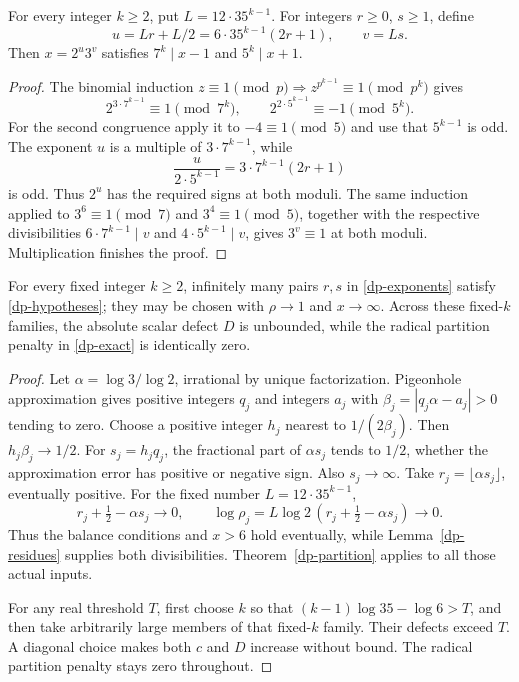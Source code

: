 \begin{lemma}\label{dp-residues}
For every integer \(k\ge2\), put \(L=12\cdot35^{k-1}\).
For integers \(r\ge0\), \(s\ge1\), define
\begin{equation}\label{dp-exponents}
 u=Lr+L/2=6\cdot35^{k-1}(2r+1),\qquad v=Ls.
\end{equation}
Then \(x=2^u3^v\) satisfies \(7^k\mid x-1\) and \(5^k\mid x+1\).
\end{lemma}
\begin{proof}
The binomial induction
\(z\equiv1\pmod p\Rightarrow z^{p^{k-1}}\equiv1\pmod{p^k}\)
gives
\[
 2^{3\cdot7^{k-1}}\equiv1\pmod{7^k},\qquad
 2^{2\cdot5^{k-1}}\equiv-1\pmod{5^k}.
\]
For the second congruence apply it to \(-4\equiv1\pmod5\) and use
that \(5^{k-1}\) is odd. The exponent \(u\) is a multiple of
\(3\cdot7^{k-1}\), while
\[
 \frac{u}{2\cdot5^{k-1}}=3\cdot7^{k-1}(2r+1)
\]
is odd. Thus \(2^u\) has the required signs at both moduli.
The same induction applied to \(3^6\equiv1\pmod7\) and
\(3^4\equiv1\pmod5\), together with the respective divisibilities
\(6\cdot7^{k-1}\mid v\) and \(4\cdot5^{k-1}\mid v\), gives
\(3^v\equiv1\) at both moduli. Multiplication finishes the proof.
\end{proof}

\begin{theorem}
\label{dp-infinite}
For every fixed integer \(k\ge2\), infinitely many pairs \(r,s\) in
\eqref{dp-exponents} satisfy \eqref{dp-hypotheses}; they may be chosen
with \(\rho\to1\) and \(x\to\infty\). Across these fixed-\(k\)
families, the absolute scalar defect \(D\) is unbounded, while the
radical partition penalty in \eqref{dp-exact} is identically zero.
\end{theorem}
\begin{proof}
Let \(\alpha=\log3/\log2\), irrational by unique factorization.
Pigeonhole approximation gives positive integers \(q_j\) and integers
\(a_j\) with \(\beta_j=|q_j\alpha-a_j|>0\) tending to zero.
Choose a positive integer \(h_j\) nearest to \(1/(2\beta_j)\).
Then \(h_j\beta_j\to1/2\). For \(s_j=h_jq_j\), the fractional
part of \(\alpha s_j\) tends to \(1/2\), whether the approximation
error has positive or negative sign. Also \(s_j\to\infty\).
Take \(r_j=\lfloor\alpha s_j\rfloor\), eventually positive. For
the fixed number \(L=12\cdot35^{k-1}\),
\[
 r_j+\tfrac12-\alpha s_j\longrightarrow0,
 \qquad
 \log\rho_j=L\log2\,(r_j+\tfrac12-\alpha s_j)\longrightarrow0.
\]
Thus the balance conditions and \(x>6\) hold eventually, while
Lemma~\ref{dp-residues} supplies both divisibilities.
Theorem~\ref{dp-partition} applies to all those actual inputs.

For any real threshold \(T\), first choose \(k\) so that
\((k-1)\log35-\log6>T\), and then take arbitrarily large members of
that fixed-\(k\) family. Their defects exceed \(T\). A diagonal choice
makes both \(c\) and \(D\) increase without bound. The radical
partition penalty stays zero throughout.
\end{proof}

